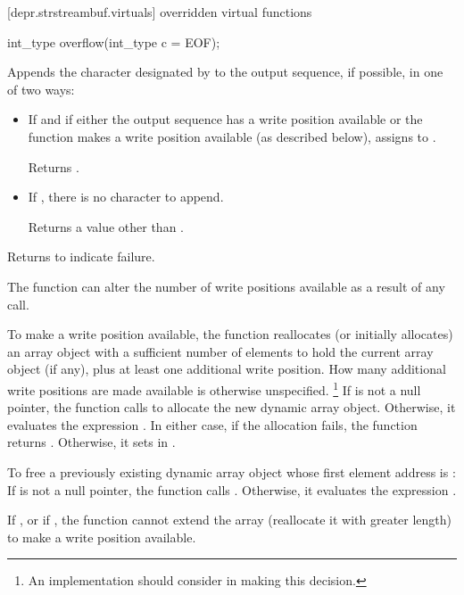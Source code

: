 [depr.strstreambuf.virtuals]{ overridden virtual functions}

%
\begin{itemdecl}
int_type overflow(int_type c = EOF);
\end{itemdecl}

\begin{itemdescr}
\pnum
\effects
Appends the character designated by  to the output
sequence, if possible, in one of two ways:
\begin{itemize}
\item
If
and if either the output sequence has a write position available or
the function makes a write position available
(as described below),
assigns  to
.

\pnum
Returns
.
\item
If
,
there is no character to append.

\pnum
Returns a value other than .
\end{itemize}

\pnum
Returns
to indicate failure.

\pnum
\notes
The function can alter the number of write positions available as a
result of any call.

\pnum
To make a write position available, the function reallocates
(or initially allocates)
an array object with a sufficient number of elements
 to hold the current array object (if any),
plus at least one additional write position.
How many additional write positions are made
available is otherwise unspecified.%
%
\footnote{An implementation should consider  in making this
decision.}
If  is not a null pointer, the function calls
to allocate the new dynamic array object.
Otherwise, it evaluates the expression
.
In either case, if the allocation fails, the function returns
.
Otherwise, it sets  in .

\pnum
To free a previously existing dynamic array object whose first
element address is :
If  is not a null pointer,
the function calls
.
Otherwise, it evaluates the expression .

\pnum
If
,
or if
,
the function cannot extend the array (reallocate it with greater length) to make a write position available.
\end{itemdescr}

